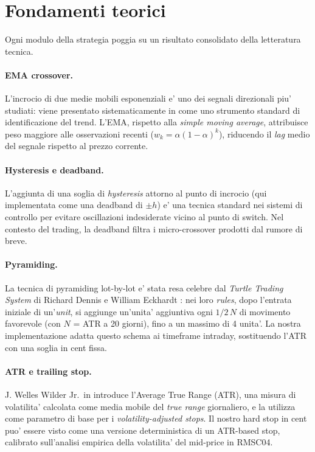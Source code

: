 \documentclass[11pt,a4paper]{article}
\begin{document}
\section{Fondamenti teorici}
\label{sec:theory}

Ogni modulo della strategia poggia su un risultato consolidato della
letteratura tecnica.

\paragraph{EMA crossover.}
L'incrocio di due medie mobili esponenziali e' uno dei segnali
direzionali piu' studiati: viene presentato sistematicamente in
\cite{murphy1999technical} come uno strumento standard di
identificazione del trend.  L'EMA, rispetto alla \emph{simple moving
average}, attribuisce peso maggiore alle osservazioni recenti
($w_k = \alpha(1-\alpha)^k$), riducendo il \emph{lag} medio del
segnale rispetto al prezzo corrente.

\paragraph{Hysteresis e deadband.}
L'aggiunta di una soglia di \emph{hysteresis} attorno al punto di
incrocio (qui implementata come una deadband di $\pm h$) e' una
tecnica standard nei sistemi di controllo per evitare oscillazioni
indesiderate vicino al punto di switch.  Nel contesto del trading,
la deadband filtra i micro-crossover prodotti dal rumore di breve.

\paragraph{Pyramiding.}
La tecnica di pyramiding lot-by-lot e' stata resa celebre dal
\emph{Turtle Trading System} di Richard Dennis e William Eckhardt
\cite{covel2007turtle}: nei loro \emph{rules}, dopo l'entrata
iniziale di un'\emph{unit}, si aggiunge un'unita' aggiuntiva ogni
$1/2\,N$ di movimento favorevole (con $N$ = ATR a 20 giorni), fino
a un massimo di 4 unita'.  La nostra implementazione adatta questo
schema ai timeframe intraday, sostituendo l'ATR con una soglia in
cent fissa.

\paragraph{ATR e trailing stop.}
J. Welles Wilder Jr.\ in \cite{wilder1978new} introduce l'Average
True Range (ATR), una misura di volatilita' calcolata come media
mobile del \emph{true range} giornaliero, e la utilizza come
parametro di base per i \emph{volatility-adjusted stops}.  Il
nostro hard stop in cent puo' essere visto come una versione
deterministica di un ATR-based stop, calibrato sull'analisi
empirica della volatilita' del mid-price in RMSC04.
\end{document}
